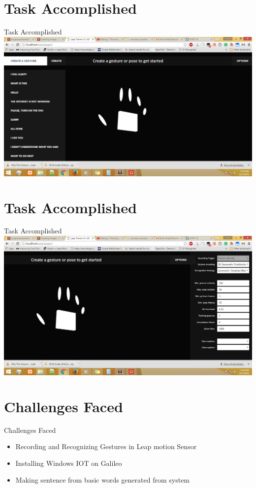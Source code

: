 \documentclass[10pt, a4paper]{beamer}
\begin{document}
\section{Task Accomplished}
\begin{frame}{Task Accomplished}
	\includegraphics[totalheight=0.75\textheight]{ui}
\end{frame}
\section{Task Accomplished}
\begin{frame}{Task Accomplished}
	\includegraphics[totalheight=0.75\textheight]{ui_options}
\end{frame}
\section{Challenges Faced}
\begin{frame}{Challenges Faced}
	\begin{itemize}
		\item Recording and Recognizing Gestures in Leap motion Sensor
		\item Installing Windows IOT on Galileo
		\item Making sentence from basic words generated from system
	\end{itemize}
\end{frame}
\end{document}

